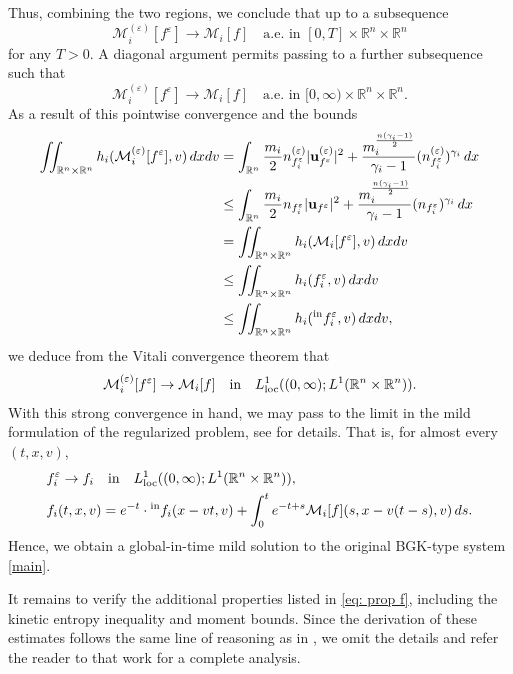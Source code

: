\documentclass[10pt,reqno]{amsart}
\numberwithin{equation}{section}
\newcommand{\R}{\mathbb R}
\newcommand{\intr}{\int_{\R^n}}
\newcommand{\calM}{\mathcal M}
\newcommand{\ve}{\varepsilon}
\begin{document}
    
Thus, combining the two regions, we conclude that up to a subsequence
\[
\calM_i^{(\ve)}[f^\ve] \to \calM_i[f] \quad \mbox{a.e. in } [0,T]\times\R^n \times \R^n
\]
for any $T>0$. A diagonal argument permits passing to a further subsequence such that 
\[
\calM_i^{(\ve)}[f^\ve] \to \calM_i[f] \quad \mbox{a.e. in } [0,\infty)\times\R^n \times \R^n.
\]
As a result of this pointwise convergence and the bounds
\begin{align*}
    \iint_{\R^n \times \R^n} h_i(\calM_i^{(\ve)}[f^\ve],v) \,dxdv &= \intr \frac{m_i}{2}n_{f_i^\ve}^{(\ve)}|{\bf{u}}_{f^\ve}^{(\ve)}|^2 + \frac{m_i^{\frac{n(\gamma_i-1)}{2}}}{\gamma_i-1} (n_{f_i^\ve}^{(\ve)})^{\gamma_i}\,dx\\
    &\le \intr \frac{m_i}{2}n_{f_i^\ve}|{\bf{u}}_{f^\ve}|^2 + \frac{m_i^{\frac{n(\gamma_i-1)}{2}}}{\gamma_i-1} (n_{f_i^\ve})^{\gamma_i}\,dx\\
    &= \iint_{\R^n \times \R^n} h_i(\calM_i[f^\ve],v)\,dxdv \\
    &\le \iint_{\R^n \times \R^n} h_i(f_i^\ve,v)\,dxdv \\
    &\le \iint_{\R^n \times \R^n} h_i({}^{\rm in}f_i^\ve,v)\,dxdv,
\end{align*}
we deduce from the Vitali convergence theorem that
\begin{align*}
    \calM_i^{(\ve)}[f^\ve] \to \calM_i[f] \quad \text{in}\quad L^1_{\rm loc}((0,\infty); L^1(\R^n \times \R^n)).
\end{align*}
With this strong convergence in hand, we may pass to the limit in the mild formulation of the regularized problem, see \cite[Lemma 4.3]{KS24} for details. That is, for almost every $(t,x,v)$,
\begin{align*}
    &f_i^\ve \to f_i \quad \text{in} \quad L^1_{\rm loc}((0,\infty);L^1(\R^n \times \R^n)),\\
    &f_i(t,x,v) = e^{-t} \cdot {}^{\rm in}f_i(x-vt,v) + \int_0^t e^{-t+s} \calM_i[f](s,x-v(t-s),v)\,ds.
\end{align*}
Hence, we obtain a global-in-time mild solution to the original BGK-type system \eqref{main}.

It remains to verify the additional properties listed in \eqref{eq: prop f}, including the kinetic entropy inequality and moment bounds. Since the derivation of these estimates follows the same line of reasoning as in \cite[Sections 4--5]{KS24}, we omit the details and refer the reader to that work for a complete analysis.
%
%
%
%
%
%
%
%
%
%
%
%
%
\end{document}
